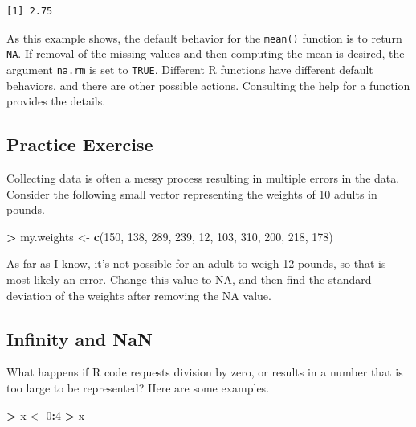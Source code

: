 \documentclass[]{krantz}
\makeatletter
\newenvironment{Shaded}{\begin{snugshade}}{\end{snugshade}}
\newcommand{\KeywordTok}[1]{\textcolor[rgb]{0.27,0.27,0.27}{\textbf{#1}}}
\newcommand{\DecValTok}[1]{\textcolor[rgb]{0.06,0.06,0.06}{#1}}
\newcommand{\StringTok}[1]{\textcolor[rgb]{0.5,0.5,0.5}{#1}}
\newcommand{\OperatorTok}[1]{\textcolor[rgb]{0.43,0.43,0.43}{\textbf{#1}}}
\newcommand{\NormalTok}[1]{#1}
\newenvironment{kframe}{%
\medskip{}
\setlength{\fboxsep}{.8em}
 \def\at@end@of@kframe{}%
 \ifinner\ifhmode%
  \def\at@end@of@kframe{\end{minipage}}%
  \begin{minipage}{\columnwidth}%
 \fi\fi%
 \def\FrameCommand##1{\hskip\@totalleftmargin \hskip-\fboxsep
 \colorbox{shadecolor}{##1}\hskip-\fboxsep
     \hskip-\linewidth \hskip-\@totalleftmargin \hskip\columnwidth}%
 \MakeFramed {\advance\hsize-\width
   \@totalleftmargin\z@ \linewidth\hsize
   \@setminipage}}%
 {\par\unskip\endMakeFramed%
 \at@end@of@kframe}
\renewenvironment{Shaded}{\begin{kframe}}{\end{kframe}}
\makeatother
\begin{document}
\begin{verbatim}
[1] 2.75
\end{verbatim}

As this example shows, the default behavior for the \texttt{mean()}
function is to return \texttt{NA}. If removal of the missing values and
then computing the mean is desired, the argument \texttt{na.rm} is set
to \texttt{TRUE}. Different R functions have different default
behaviors, and there are other possible actions. Consulting the help for
a function provides the details.

\subsection{Practice Exercise}\label{practice-exercise-2}

Collecting data is often a messy process resulting in multiple errors in
the data. Consider the following small vector representing the weights
of 10 adults in pounds.

\begin{Shaded}
\begin{Highlighting}[]
\OperatorTok{>}\StringTok{ }\NormalTok{my.weights <-}\StringTok{ }\KeywordTok{c}\NormalTok{(}\DecValTok{150}\NormalTok{, }\DecValTok{138}\NormalTok{, }\DecValTok{289}\NormalTok{, }\DecValTok{239}\NormalTok{, }\DecValTok{12}\NormalTok{, }\DecValTok{103}\NormalTok{, }\DecValTok{310}\NormalTok{, }\DecValTok{200}\NormalTok{, }\DecValTok{218}\NormalTok{, }\DecValTok{178}\NormalTok{)}
\end{Highlighting}
\end{Shaded}

As far as I know, it's not possible for an adult to weigh 12 pounds, so
that is most likely an error. Change this value to NA, and then find the
standard deviation of the weights after removing the NA value.

\subsection{Infinity and NaN}\label{infinity-and-nan}

What happens if R code requests division by zero, or results in a number
that is too large to be represented? Here are some examples.

\begin{Shaded}
\begin{Highlighting}[]
\OperatorTok{>}\StringTok{ }\NormalTok{x <-}\StringTok{ }\DecValTok{0}\OperatorTok{:}\DecValTok{4}
\OperatorTok{>}\StringTok{ }\NormalTok{x}
\end{Highlighting}
\end{Shaded}
\end{document}
